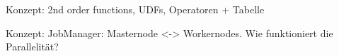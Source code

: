 Konzept: 2nd order functions, UDFs, Operatoren + Tabelle 

Konzept: JobManager: Masternode <-> Workernodes. Wie funktioniert die Parallelität?

